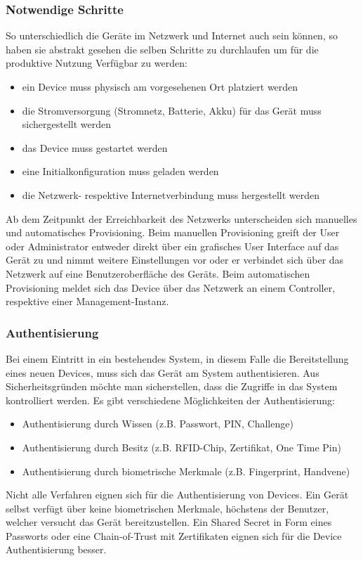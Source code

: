 \subsubsection{Notwendige Schritte}So unterschiedlich die Geräte im Netzwerk und Internet auch sein können, so haben sie abstrakt gesehen die selben Schritte zu durchlaufen um für die produktive Nutzung Verfügbar zu werden:
\begin{itemize}
\item ein Device muss physisch am vorgesehenen Ort platziert werden
\item die Stromversorgung (Stromnetz, Batterie, Akku) für das Gerät muss sichergestellt werden
\item das Device muss gestartet werden
\item eine Initialkonfiguration muss geladen werden
\item die Netzwerk- respektive Internetverbindung muss hergestellt werden
\end{itemize}
Ab dem Zeitpunkt der Erreichbarkeit des Netzwerks unterscheiden sich manuelles und automatisches Provisioning. Beim manuellen Provisioning greift der User oder Administrator entweder direkt über ein grafisches User Interface auf das Gerät zu und nimmt weitere Einstellungen vor oder er verbindet sich über das Netzwerk auf eine Benutzeroberfläche des Geräts. Beim automatischen Provisioning meldet sich das Device über das Netzwerk an einem Controller, respektive einer Management-Instanz.

\subsubsection{Authentisierung} Bei einem Eintritt in ein bestehendes System, in diesem Falle die Bereitstellung eines neuen Devices, muss sich das Gerät am System authentisieren. Aus Sicherheitsgründen möchte man sicherstellen, dass die Zugriffe in das System kontrolliert werden. Es gibt verschiedene Möglichkeiten der Authentisierung:
\begin{itemize}
\item Authentisierung durch Wissen (z.B. Passwort, PIN, Challenge)
\item Authentisierung durch Besitz (z.B. RFID-Chip, Zertifikat, One Time Pin)
\item Authentisierung durch biometrische Merkmale (z.B. Fingerprint, Handvene)
\end{itemize}
Nicht alle Verfahren eignen sich für die Authentisierung von Devices. Ein Gerät selbst verfügt über keine biometrischen Merkmale, höchstens der Benutzer, welcher versucht das Gerät bereitzustellen. Ein Shared Secret in Form eines Passworts oder eine Chain-of-Trust mit Zertifikaten eignen sich für die Device Authentisierung besser. 

